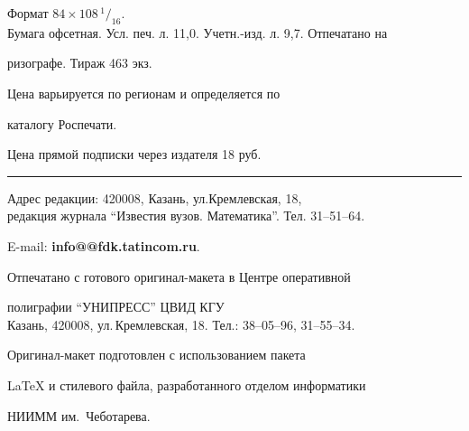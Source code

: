 Формат $84\times 108 \,^1/_{16}.$\\


Бумага офсетная. Усл. печ. л. 11,0. Учетн.-изд. л. 9,7. Отпечатано на 


ризографе. Тираж 463 экз. 





\noindent Цена варьируется по регионам и определяется по 


каталогу Роспечати. 





\noindent Цена прямой подписки через издателя 18 руб. 


\bigskip


\hrule


\bigskip


\noindent Адрес редакции: 420008, Казань, ул.Кремлевская, 18,\\  


редакция журнала  ``Известия вузов. Математика''. Тел. 31--51--64.





\noindent E-mail: {\bf info@@fdk.tatincom.ru}. \par


\bigskip 


\noindent Отпечатано с готового оригинал-макета в Центре оперативной


полиграфии ``УНИПРЕСС'' ЦВИД КГУ \\


Казань, 420008, ул.\,Кремлевская, 18. Тел.: 38--05--96, 31--55--34. \par


\bigskip


\noindent Оригинал-макет подготовлен с использованием пакета


\AmS\LaTeX{} и стилевого файла, разработанного отделом информатики


НИИММ им.~Чеботарева.








